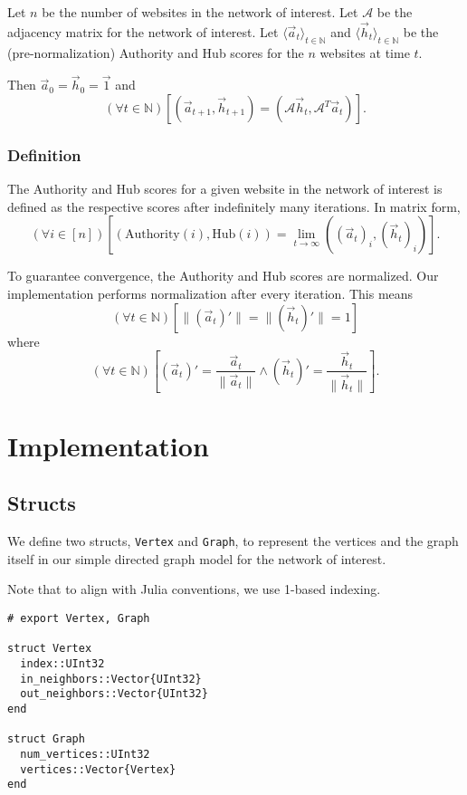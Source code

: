 \documentclass[12pt, titlepage, twoside]{amsart}
\newcommand{\N}{\ensuremath{\mathbb N}}
\begin{document}
Let $n$ be the number of websites in the network of interest.
Let $\mathcal{A}$ be the adjacency matrix for the network of interest.
Let $\langle\vec{a}_t\rangle_{t\in\N}$ and $\langle\vec{h}_t\rangle_{t\in\N}$ be the (pre-normalization)
Authority and Hub scores for the $n$ websites at time $t$.

Then $\vec{a}_0 = \vec{h}_0 = \vec{1}$ and
\[
  (\forall t\in\N)
  \left[
    \left(\vec{a}_{t + 1}, \vec{h}_{t + 1}\right) = \left(\mathcal{A}\vec{h}_t, \mathcal{A}^T\vec{a}_t\right)
  \right].
\]

\subsubsection{Definition} The Authority and Hub scores for a given website in the network of interest is defined
as the respective scores after indefinitely many iterations.
In matrix form,
\[
  (\forall i\in[n])
  \left[
    \left(\mathrm{Authority}(i), \mathrm{Hub}(i)\right) =
    \lim_{t\to\infty}
    \left((\vec{a}_t)_i, (\vec{h}_t)_i\right)
  \right].
\]

To guarantee convergence, the Authority and Hub scores are normalized.
Our implementation performs normalization after every iteration.
This means
\[
  (\forall t\in\N)
  \left[
    \lVert(\vec{a}_t)'\rVert = \lVert(\vec{h}_t)'\rVert = 1
  \right]
\]
where
\[
  (\forall t\in\N)
  \left[
    (\vec{a}_t)' = \frac{\vec{a}_t}{\lVert\vec{a}_t\rVert}
    \wedge
    (\vec{h}_t)' = \frac{\vec{h}_t}{\lVert\vec{h}_t\rVert}
  \right].
\]

\section{Implementation}

\subsection{Structs}

We define two structs, \texttt{Vertex} and \texttt{Graph}, to represent
the vertices and the graph itself in our simple directed graph model for the network of interest.

Note that to align with Julia conventions, we use 1-based indexing.~\cite{julialang}

\begin{verbatim}
# export Vertex, Graph

struct Vertex
  index::UInt32
  in_neighbors::Vector{UInt32}
  out_neighbors::Vector{UInt32}
end

struct Graph
  num_vertices::UInt32
  vertices::Vector{Vertex}
end
\end{verbatim}
\end{document}
